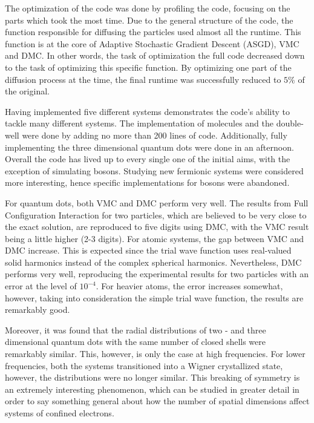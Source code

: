 The optimization of the code was done by profiling the code, focusing on the parts which took the most time. Due to the general structure of the code, the function responsible for diffusing the particles used almost all the runtime. This function is at the core of Adaptive Stochastic Gradient Descent (ASGD), VMC and DMC. In other words, the task of optimization the full code decreased down to the task of optimizing this specific function. By optimizing one part of the diffusion process at the time, the final runtime was successfully reduced to $5\%$ of the original.

Having implemented five different systems demonstrates the code's ability to tackle many different systems. The implementation of molecules and the double-well were done by adding no more than 200 lines of code. Additionally, fully implementing the three dimensional quantum dots were done in an afternoon. Overall the code has lived up to every single one of the initial aims, with the exception of simulating bosons. Studying new fermionic systems were considered more interesting, hence specific implementations for bosons were abandoned.  

For quantum dots, both VMC and DMC perform very well. The results from Full Configuration Interaction \cite{Olsen} for two particles, which are believed to be very close to the exact solution, are reproduced to five digits using DMC, with the VMC result being a little higher (2-3 digits). For atomic systems, the gap between VMC and DMC increase. This is expected since the trial wave function uses real-valued solid harmonics instead of the complex spherical harmonics. Nevertheless, DMC performs very well, reproducing the experimental results for two particles with an error at the level of $10^{-4}$. For heavier atoms, the error increases somewhat, however, taking into consideration the simple trial wave function, the results are remarkably good.

Moreover, it was found that the radial distributions of two - and three dimensional quantum dots with the same number of closed shells were remarkably similar. This, however, is only the case at high frequencies. For lower frequencies, both the systems transitioned into a Wigner crystallized state, however, the distributions were no longer similar. This breaking of symmetry is an extremely interesting phenomenon, which can be studied in greater detail in order to say something general about how the number of spatial dimensions affect systems of confined electrons.

